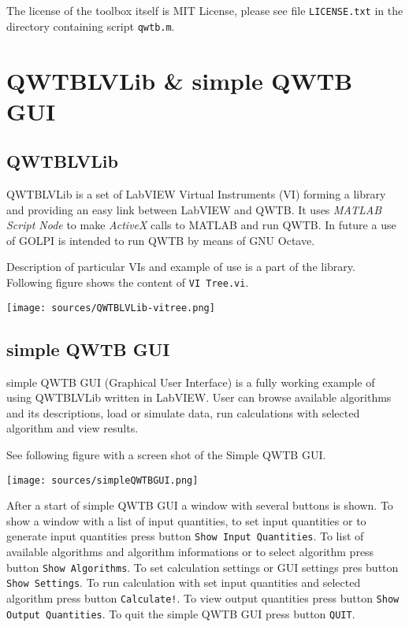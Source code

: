 \documentclass[12pt,a4paper,oneside]{report} %
\def\matlab{{\sc MATLAB}\xspace}
\def\octave{{\sc GNU Octave}\xspace}
\def\labview{{\sc LabVIEW}\xspace}
\begin{document}
The license of the toolbox itself is MIT License, please see file {\tt LICENSE.txt} in the directory
containing script {\tt qwtb.m}.

\chapter{QWTBLVLib \& simple QWTB GUI} %
\section{QWTBLVLib} %
QWTBLVLib is a set of \labview Virtual Instruments (VI) forming a library and providing an easy link
between \labview and QWTB. It uses {\em MATLAB Script
Node} to make {\em ActiveX} calls to \matlab and run QWTB. In future a use of {\sc GOLPI} is intended to run QWTB
by means of \octave.

Description of particular VIs and example of use is a part of the library.
Following figure shows the content of {\tt VI Tree.vi}.

\begin{center}
        \texttt{[image: sources/QWTBLVLib-vitree.png]}
\end{center}

\section{simple QWTB GUI} %
simple QWTB GUI (Graphical User Interface) is a fully working example of using QWTBLVLib written in \labview.
User can browse available algorithms and its descriptions, load or simulate data, run calculations
with selected algorithm and view results.

See following figure with a screen shot of the Simple QWTB GUI.

\begin{center}
        \texttt{[image: sources/simpleQWTBGUI.png]}
\end{center}

After a start of simple QWTB GUI a window with several buttons is shown. To show
a window with a list of input quantities, to set input quantities or to generate input quantities
press button {\tt Show Input Quantities}. To list of available algorithms and algorithm informations
or to select algorithm press button
{\tt Show Algorithms}. To set calculation settings or GUI settings pres  button {\tt Show Settings}.
To run calculation with set input quantities and selected algorithm press  button {\tt Calculate!}.
To view output quantities press button {\tt Show Output Quantities}. To quit the simple QWTB
GUI press button {\tt QUIT}.
\end{document}
